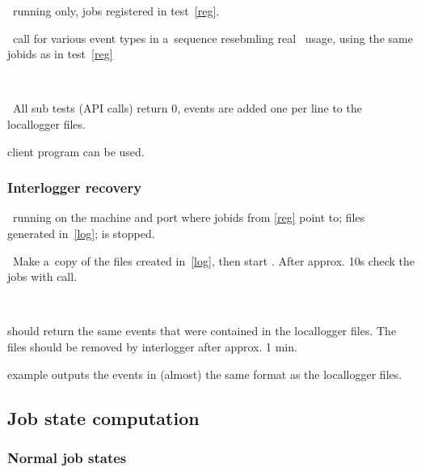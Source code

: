 \req\ running  only, jobs registered in test~\ref{reg}.

\what\ call  for various event types in a~sequence
resebmling real \LB\ usage, using the same jobids as in test~\ref{reg}

\how\ 

\result\ All sub tests (API calls) return 0, events are added one per line to the locallogger files.

\begin{hints}
 client program can be used.

\end{hints}



\subsubsection{Interlogger recovery}
\label{recover}

\req\ running  on the machine and port where
jobids from \ref{reg} point to; files generated in~\ref{log};
 is stopped.

\what\ Make a~copy of the files created in~\ref{log}, then start
. After approx. 10s check the jobs
with  call.

\how\ 

\result {} should return the same events that were
contained in the locallogger files. The files should be removed by
interlogger after approx. 1 min.

\begin{hints}
 example outputs the events in (almost) the same
format as the locallogger files.
\end{hints}




\subsection{Job state computation}

\subsubsection{Normal job states}
\label{state}


